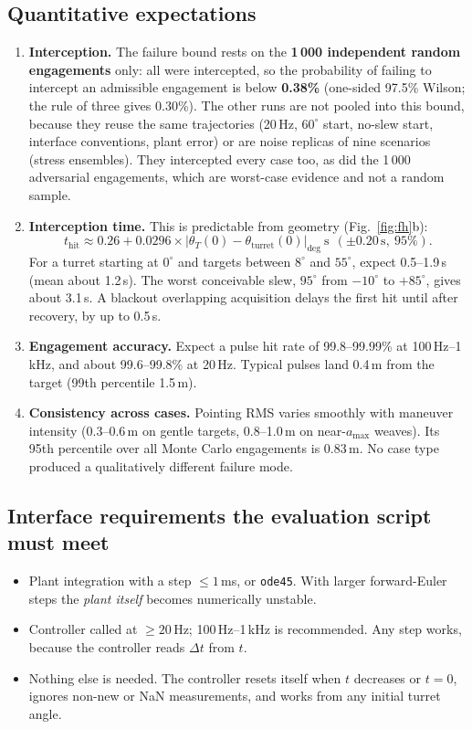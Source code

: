 \documentclass[11pt,a4paper]{article}
\begin{document}
\subsection{Quantitative expectations}
\begin{enumerate}
\item \textbf{Interception.} The failure bound rests on the \textbf{1\,000 independent random engagements} only: all were intercepted, so the probability of failing to intercept an admissible engagement is below \textbf{0.38\%} (one-sided 97.5\% Wilson; the rule of three gives 0.30\%). The other runs are not pooled into this bound, because they reuse the same trajectories (20\,Hz, $60^\circ$ start, no-slew start, interface conventions, plant error) or are noise replicas of nine scenarios (stress ensembles). They intercepted every case too, as did the 1\,000 adversarial engagements, which are worst-case evidence and not a random sample.
\item \textbf{Interception time.} This is predictable from geometry (Fig.~\ref{fig:fh}b):
\[ t_{\mathrm{hit}} \approx 0.26 + 0.0296\times\big|\theta_T(0)-\theta_{\mathrm{turret}}(0)\big|_{\mathrm{deg}}\ \mathrm{s}\ \ (\pm0.20\,\mathrm s,\ 95\%). \]
For a turret starting at $0^\circ$ and targets between $8^\circ$ and $55^\circ$, expect 0.5--1.9\,s (mean about 1.2\,s). The worst conceivable slew, $95^\circ$ from $-10^\circ$ to $+85^\circ$, gives about 3.1\,s. A blackout overlapping acquisition delays the first hit until after recovery, by up to 0.5\,s.
\item \textbf{Engagement accuracy.} Expect a pulse hit rate of 99.8--99.99\% at 100\,Hz--1\,kHz, and about 99.6--99.8\% at 20\,Hz. Typical pulses land 0.4\,m from the target (99th percentile 1.5\,m).
\item \textbf{Consistency across cases.} Pointing RMS varies smoothly with maneuver intensity (0.3--0.6\,m on gentle targets, 0.8--1.0\,m on near-$a_{\max}$ weaves). Its 95th percentile over all Monte Carlo engagements is 0.83\,m. No case type produced a qualitatively different failure mode.
\end{enumerate}

\subsection{Interface requirements the evaluation script must meet}
\begin{itemize}
\item Plant integration with a step $\le1$\,ms, or \texttt{ode45}. With larger forward-Euler steps the \emph{plant itself} becomes numerically unstable.
\item Controller called at $\ge20$\,Hz; 100\,Hz--1\,kHz is recommended. Any step works, because the controller reads $\Delta t$ from $t$.
\item Nothing else is needed. The controller resets itself when $t$ decreases or $t=0$, ignores non-new or NaN measurements, and works from any initial turret angle.
\end{itemize}
\end{document}
